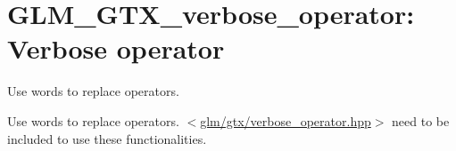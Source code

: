 \hypertarget{group__gtx__verbose__operator}{\section{\-G\-L\-M\-\_\-\-G\-T\-X\-\_\-verbose\-\_\-operator\-: \-Verbose operator}
\label{group__gtx__verbose__operator}
}


\-Use words to replace operators.  


\-Use words to replace operators. $<$\hyperlink{verbose__operator_8hpp}{glm/gtx/verbose\-\_\-operator.\-hpp}$>$ need to be included to use these functionalities. 